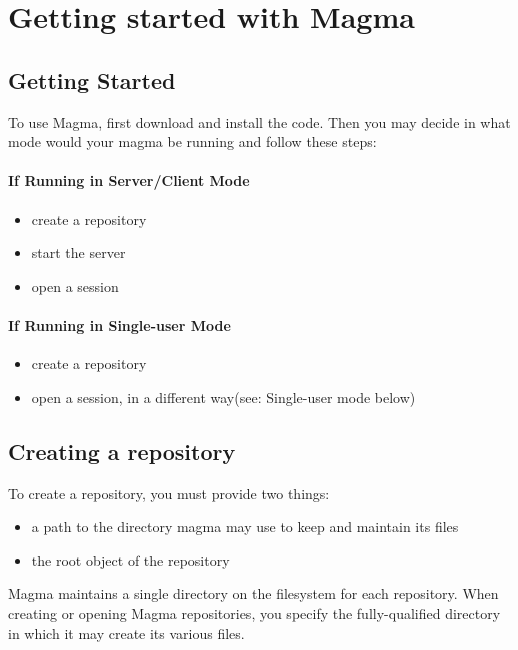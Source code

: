 \documentclass[a4paper,10pt,twoside]{book}
\begin{document}
\section{Getting started with Magma}

\subsection{Getting Started}

To use Magma, first download and install the code. Then you may decide in what mode would your magma be running and follow these steps:

\paragraph{If Running in Server/Client Mode}

\begin{itemize}
	\item create a repository
	\item start the server
	\item open a session
\end{itemize}

\paragraph{If Running in Single-user Mode}
\begin{itemize}
\item create a repository
\item open a session, in a different way(see: Single-user mode below)
\end{itemize}

\subsection{Creating a repository}

To create a repository, you must provide two things:
\begin{itemize}
\item a path to the directory magma may use to keep and maintain its files
\item the root object of the repository
\end{itemize}

Magma maintains a single directory on the filesystem for each repository. When creating or opening Magma repositories, you specify the fully-qualified directory in which it may create its various files.
\end{document}
